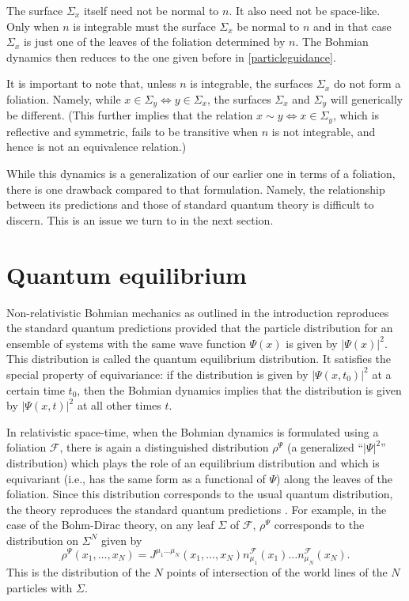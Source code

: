 \documentclass[12pt]{article}
\begin{document}
The surface $\Sigma_x$ itself need not be normal to $n$. It also need not be space-like. Only when $n$ is integrable must the surface $\Sigma_x$ be normal to $n$ and in that case $\Sigma_x$ is just one of the leaves of the foliation determined by $n$. The Bohmian dynamics then reduces to the one given before in \eqref{particleguidance}.

It is important to note that, unless $n$ is integrable, the surfaces $\Sigma_x$ do not form a foliation. Namely, while $x \in \Sigma_y \Leftrightarrow y \in \Sigma_x$, the surfaces $\Sigma_x$ and $\Sigma_y$ will generically be different. (This further implies that the relation $x \sim y \Leftrightarrow x \in \Sigma_y$, which is reflective and symmetric, fails to be transitive when $n$ is not integrable, and hence is not an equivalence relation.)

While this dynamics is a generalization of our earlier one in terms of a foliation, there is one drawback compared to that formulation. Namely, the relationship between its predictions and those of standard quantum theory is difficult to discern. This is an issue we turn to in the next section.

\section{Quantum equilibrium}
\label{sec6}
Non-relativistic Bohmian mechanics as outlined in the introduction reproduces the standard quantum predictions provided that the particle distribution for an ensemble of systems with the same wave function $\Psi(x)$ is given by $|\Psi(x)|^2$. This distribution is called the quantum equilibrium distribution. It satisfies the special property of equivariance: if the distribution is given by $|\Psi(x,t_0)|^2$ at a certain time $t_0$, then the Bohmian dynamics implies that the distribution is given by $|\Psi(x,t)|^2$ at all other times $t$.

In relativistic space-time, when the Bohmian dynamics is formulated using a foliation $\mathscr{F}$, there is again a distinguished distribution $\rho^\Psi$ (a generalized ``$|\Psi|^2$'' distribution) which plays the role of an equilibrium distribution and which is equivariant (i.e., has the same form as a functional of $\Psi$) along the leaves of the foliation. Since this distribution corresponds to the usual quantum distribution, the theory reproduces the standard quantum predictions \cite{duerr99}. For example, in the case of the Bohm-Dirac theory, on any leaf $\Sigma$ of $\mathscr{F}$, $\rho^\Psi$ corresponds to the distribution on $\Sigma^N$ given by
\begin{equation}
\rho^\Psi( x_1, \ldots, x_N) = J^{\mu_1 \ldots \mu_N} ( x_1, \ldots, x_N)  n^{\mathscr{F}}_{\mu_1}(x_1) \ldots   n^{\mathscr{F}}_{\mu_N}(x_N) .
\label{equilibrium}
\end{equation}
This is the distribution of the $N$ points of intersection of the world lines of the $N$ particles with $\Sigma$.
\end{document}
